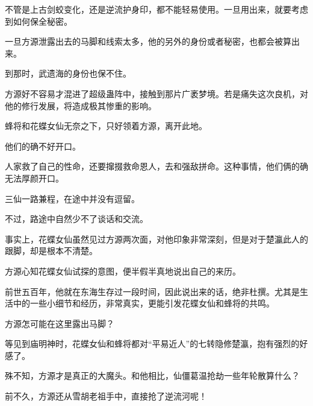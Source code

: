 \begin{this_body}
不管是上古剑蛟变化，还是逆流护身印，都不能轻易使用。一旦用出来，就要考虑到如何保全秘密。

一旦方源泄露出去的马脚和线索太多，他的另外的身份或者秘密，也都会被算出来。

到那时，武遗海的身份也保不住。

方源好不容易才混进了超级蛊阵中，接触到那片广袤梦境。若是痛失这次良机，对他的修行发展，将造成极其惨重的影响。

蜂将和花蝶女仙无奈之下，只好领着方源，离开此地。

他们的确不好开口。

人家救了自己的性命，还要撺掇救命恩人，去和强敌拼命。这种事情，他们俩的确无法厚颜开口。

三仙一路兼程，在途中并没有逗留。

不过，路途中自然少不了谈话和交流。

事实上，花蝶女仙虽然见过方源两次面，对他印象非常深刻，但是对于楚瀛此人的跟脚，却是根本不清楚。

方源心知花蝶女仙试探的意图，便半假半真地说出自己的来历。

前世五百年，他就在东海生存过一段时间，因此说出来的话，绝非杜撰。尤其是生活中的一些小细节和经历，非常真实，更能引发花蝶女仙和蜂将的共鸣。

方源怎可能在这里露出马脚？

等见到庙明神时，花蝶女仙和蜂将都对“平易近人”的七转隐修楚瀛，抱有强烈的好感了。

殊不知，方源才是真正的大魔头。和他相比，仙僵葛温抢劫一些年轮散算什么？

前不久，方源还从雪胡老祖手中，直接抢了逆流河呢！

\end{this_body}

